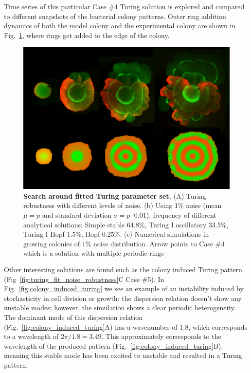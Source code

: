 Time series of this particular Case \#4 Turing solution is explored and compared to different snapshots of the bacterial colony patterns.
Outer ring addition dynamics of both the model colony and the experimental colony are shown in Fig.~\ref{fig:outer_ring_addition_modelvsexperiment}, where rings get added to the edge of the colony.
\begin{figure}[H] %
    \centering
    \begin{adjustbox}{center}
        \includegraphics[width=1\textwidth]{chapters/Chapter 3/outer_ring_addition_modelvsexperiment} %
    \end{adjustbox}
    \caption{\textbf{Search around fitted Turing parameter set.} (A) Turing robustness with different levels of noise. (b) Using 1\% noise (mean $\mu=p$ and standard deviation $\sigma=p\cdot 0.01$), frequency of different analytical solutions: Simple stable 64.8\%, Turing I oscillatory 33.5\%, Turing I Hopf 1.5\%, Hopf 0.25\%. (c) Numerical simulations in growing colonies of 1\% noise distribution. Arrow points to Case \#4 which is a solution with multiple periodic rings}
    \label{fig:outer_ring_addition_modelvsexperiment}
\end{figure}

Other interesting solutions are found such as the colony induced Turing pattern (Fig~\ref{fig:turing_fit_noise_robustness}C Case \#5).
In Fig.~\ref{fig:colony_induced_turing} we see an example of an instability induced by stochasticity in cell division or growth: the dispersion relation doesn’t show any unstable modes; however, the simulation shows a clear periodic heterogeneity.
The dominant mode of this dispersion relation (Fig.~\ref{fig:colony_induced_turing}A) has a wavenumber of 1.8, which corresponds to a wavelength of $2\pi/1.8=3.49$.
This approximately corresponds to the wavelength of the produced pattern (Fig.~\ref{fig:colony_induced_turing}B), meaning this stable mode has been excited to unstable and resulted in a Turing pattern.


